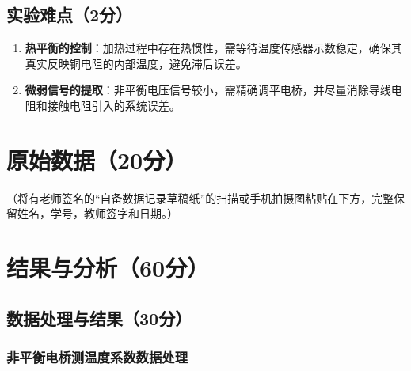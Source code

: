 \documentclass{../template/Report}%
\begin{document}
\subsection{实验难点（2分）}
\begin{enumerate}
    \item \textbf{热平衡的控制}：加热过程中存在热惯性，需等待温度传感器示数稳定，确保其真实反映铜电阻的内部温度，避免滞后误差。
    \item \textbf{微弱信号的提取}：非平衡电压信号较小，需精确调平电桥，并尽量消除导线电阻和接触电阻引入的系统误差。
\end{enumerate}

\begin{fullreportonly}
    \section{原始数据（20分）}
    （将有老师签名的“自备数据记录草稿纸”的扫描或手机拍摄图粘贴在下方，完整保留姓名，学号，教师签字和日期。）

    \section{结果与分析（60分）}

    \subsection{数据处理与结果（30分）}

    \subsubsection{非平衡电桥测温度系数数据处理}


\end{fullreportonly}
\end{document}
